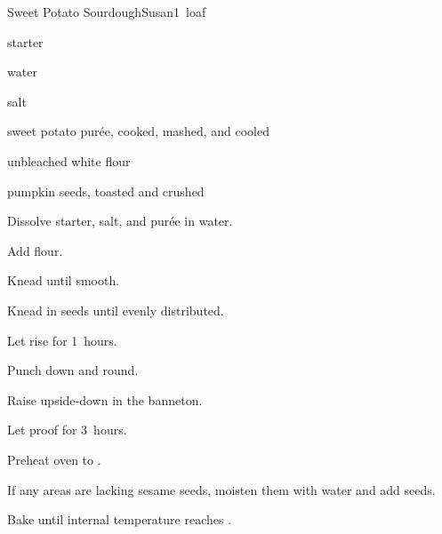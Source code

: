 \begin{recipe}{Sweet Potato Sourdough}{Susan}{1~loaf}

\begin{ingredients}
\item {} starter
\item {} water
\item {} salt
\item {} sweet potato pur\'ee, cooked, mashed, and cooled
\item {} unbleached white flour
\item {} pumpkin seeds, toasted and crushed
\end{ingredients}

\begin{directions}
\item Dissolve starter, salt, and pur\'ee in water.
\item Add flour.
\item Knead until smooth.
\item Knead in seeds until evenly distributed.
\item Let rise for 1\half{}~hours.
\item Punch down and round.
\item Raise upside-down in the banneton.
\item Let proof for 3~hours.
\item Preheat oven to .
\item If any areas are lacking sesame seeds, moisten them with water and add seeds.
\item Bake until internal temperature reaches .
\end{directions}
\end{recipe}
